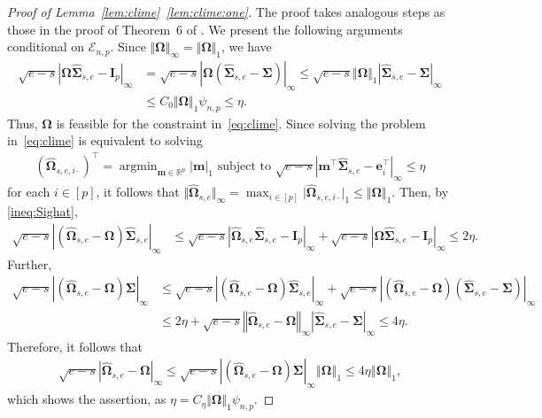 \documentclass[11pt, a4paper]{article}
\newcommand{\mbf}{\mathbf}
\newcommand{\mc}{\mathcal}
\renewcommand{\l}{\left}
\renewcommand{\r}{\right}
\def\wh{\widehat}
\newcommand{\R}{\mathbb{R}}
\newcommand{\nn}{\nonumber}
\theoremstyle{definition}
\theoremstyle{definition}
\theoremstyle{definition}
\theoremstyle{definition}
\theoremstyle{definition}
\theoremstyle{remark}
\theoremstyle{definition}
\theoremstyle{definition}
\theoremstyle{definition}
\begin{document}
\begin{proof}[Proof of Lemma~\ref{lem:clime}~\ref{lem:clime:one}]
	The proof takes analogous steps as those in the proof of Theorem~6 of \cite{cai2011constrained}.
	We present the following arguments conditional on $\mc E_{n, p}$.
	Since $\Vert \bm\Omega \Vert_\infty = \Vert \bm\Omega \Vert_1$, we have
	\begin{align}
	\sqrt{ e - s } \l\vert \bm\Omega \wh{\bm\Sigma}_{s, e} - \mbf I_p \r\vert_\infty
	&= \sqrt{ e - s } \l\vert \bm\Omega \l(\wh{\bm\Sigma}_{s, e} - \bm\Sigma\r) \r\vert_\infty
	\le \sqrt{ e - s } \Vert \bm\Omega \Vert_1 \l\vert \wh{\bm\Sigma}_{s, e} - \bm\Sigma \r\vert_\infty \nn\\
	&\le C_0 \Vert \bm\Omega \Vert_1 \psi_{n, p} \le \eta.\label{ineq:Sighat}
	\end{align}
	Thus, $\bm\Omega$ is feasible for the constraint in~\eqref{eq:clime}. Since solving the problem in~\eqref{eq:clime} is equivalent to solving
	\begin{align*}
	(\wh{\bm\Omega}_{s, e, i \cdot})^\top = \mathop{\arg\min}_{\mbf m \in \R^p} \vert \mbf m \vert_1 
	\text{ \ subject to \ }
	\sqrt{e - s} \l\vert \mbf m^\top \wh{\bm\Sigma}_{s, e} - \mbf e_i^\top \r\vert_\infty \le \eta
	\end{align*}
	for each $i \in [p]$, it follows that 
	$\Vert \wh{\bm\Omega}_{s, e} \Vert_\infty = \max_{i \in [p]} \vert \wh{\bm\Omega}_{s, e, i \cdot} \vert_1 \le \Vert \bm\Omega \Vert_1$.
	Then, by \eqref{ineq:Sighat},
	\begin{align*}
	\sqrt{e - s} \l\vert \l( \wh{\bm\Omega}_{s, e} - \bm\Omega \r)\wh{\bm\Sigma}_{s, e} \r\vert_\infty
	& \le \sqrt{e - s} \l\vert \wh{\bm\Omega}_{s, e} \wh{\bm\Sigma}_{s, e} - \mbf I_p \r\vert_\infty
	+ \sqrt{e - s} \l\vert \bm\Omega \wh{\bm\Sigma}_{s, e} -\mbf I_p   \r\vert_\infty \le 2\eta.
	\end{align*}
	Further,
	\begin{align*}
	\sqrt{e - s} \l\vert \l( \wh{\bm\Omega}_{s, e} - \bm\Omega \r) \bm\Sigma  \r\vert_\infty
	& \le \sqrt{e-s} \l\vert \l( \wh{\bm\Omega}_{s, e} - \bm\Omega \r) \wh{\bm\Sigma}_{s, e} \r\vert_\infty
	+ \sqrt{e - s} \l\vert \l( \wh{\bm\Omega}_{s, e}- \bm\Omega \r) \l(\wh{\bm\Sigma}_{s, e} - \bm\Sigma\r) \r\vert_\infty
	\\
	&\le 2 \eta +
	\sqrt{e - s} \l\Vert \wh{\bm\Omega}_{s, e} - \bm\Omega  \r\Vert_\infty
	\l\vert \wh{\bm\Sigma}_{s, e} - \bm\Sigma\r\vert_\infty
	\le 4 \eta.
	\end{align*}
	Therefore, it follows that
	\begin{align*}
	\sqrt{e - s} \l\vert \wh{\bm\Omega}_{s, e} - \bm\Omega  \r\vert_\infty
	\le \sqrt{e - s} \l\vert \l( \wh{\bm\Omega}_{s, e} - \bm\Omega \r) \bm\Sigma \r\vert_\infty \l\Vert \bm\Omega  \r\Vert_1
	\le 4 \eta \l\Vert \bm\Omega  \r\Vert_1 ,
	\end{align*}
	which shows the assertion, as $\eta = C_\eta \Vert \bm\Omega \Vert_1 \psi_{n, p}$.
\end{proof}
\end{document}
